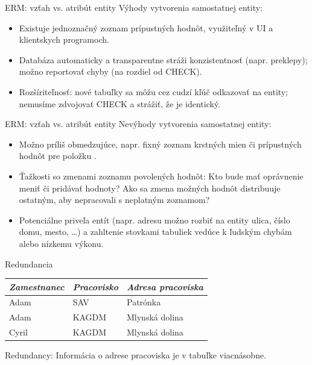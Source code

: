 \documentclass[12pt]{beamer}
\begin{document}
\begin{frame}[fragile]{ERM: vzťah vs. atribút entity}
Výhody vytvorenia samostatnej entity:
\begin{itemize}
\item Existuje jednoznačný zoznam prípustných hodnôt, využiteľný v UI a klientskych programoch.
\item Databáza automaticky a transparentne stráži konzistentnosť (napr. preklepy); možno  reportovať chyby (na rozdiel od CHECK).
\item Rozšíriteľnosť: nové tabuľky sa môžu cez cudzí kľúč odkazovať na entity; nemusíme zdvojovať CHECK a strážiť, že je identický.
\end{itemize}
\end{frame}

\begin{frame}[fragile]{ERM: vzťah vs. atribút entity}
Nevýhody vytvorenia samostatnej entity:
\begin{itemize}
\item Možno príliš obmedzujúce, napr. fixný zoznam krstných mien či prípustných hodnôt pre položku .
\item Ťažkosti so zmenami zoznamu povolených hodnôt:
    Kto bude mať oprávnenie meniť či pridávať hodnoty?
    Ako sa zmena možných hodnôt distribuuje ostatným, aby nepracovali s neplatným zoznamom?
\item Potenciálne priveľa entít (napr. adresu možno rozbiť na entity ulica, číslo domu, mesto, \dots)
    a zahltenie stovkami tabuliek vedúce k ľudským chybám alebo nízkemu výkonu.
\end{itemize}
\end{frame}

\begin{frame}[fragile]{Redundancia}
\begin{tabular}{|l|l|l|}
\hline
\emph{Zamestnanec} & \emph{Pracovisko} & \emph{Adresa pracoviska} \\\hline
Adam & SAV & Patrónka \\\hline
Adam & KAGDM & Mlynská dolina \\\hline
Cyril & KAGDM & Mlynská dolina \\\hline
\end{tabular}
\bigskip

\alert{Redundancy}: Informácia o adrese pracoviska je v tabuľke viacnásobne.
\end{frame}
\end{document}
